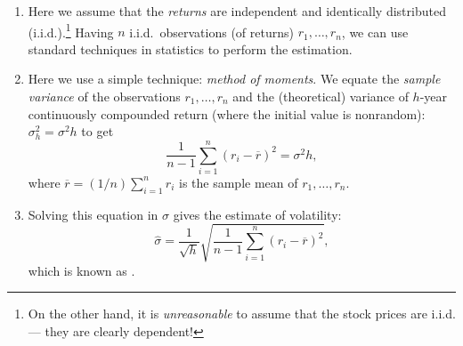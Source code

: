 \begin{enumerate}
\item Here we assume that the \emph{returns} are independent and identically
distributed (i.i.d.).\footnote{On the other hand, it is \emph{unreasonable} to
assume that the stock prices are i.i.d. --- they are clearly dependent!} Having
\(n\) i.i.d.\ observations (of returns) \(r_1,\dotsc,r_n\), we can use standard
techniques in statistics to perform the estimation.

\item Here we use a simple technique: \emph{method of moments}. We equate the
\emph{sample variance} of the observations \(r_1,\dotsc,r_n\) and the
(theoretical) variance of \(h\)-year continuously compounded return (where the
initial value is nonrandom): \(\sigma_h^2=\sigma^2h\) to get
\[
\frac{1}{n-1}\sum_{i=1}^{n}(r_i-\overline{r})^2=\sigma^2h,
\]
where \(\overline{r}=(1/n)\sum_{i=1}^{n}r_i\) is the sample mean of
\(r_1,\dotsc,r_n\).

\item \label{it:vol-mom-est-fmla}
Solving this equation in \(\sigma\) gives the estimate of volatility:
\[\widehat{\sigma}
=\frac{1}{\sqrt{h}}\sqrt{\frac{1}{n-1}\sum_{i=1}^{n}(r_i-\overline{r})^2},\]
which is known as .
\end{enumerate}
